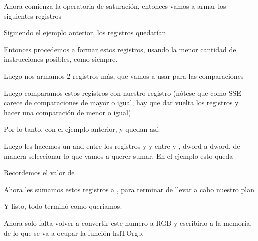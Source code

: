 

Ahora comienza la operatoria de saturación, entonces vamos a armar los siguientes registros



Siguiendo el ejemplo anterior, los registros quedarían





Entonces procedemos a formar estos registros, usando la menor cantidad de instrucciones posibles, como siempre.

Luego nos armamos 2 registros más, que vamos a usar para las comparaciones




Luego comparamos estos registros con nuestro registro  (nótese que como SSE carece de comparaciones de mayor o igual, hay que dar vuelta los registros y hacer una comparación de menor o igual).

Por lo tanto, con el ejemplo anterior,  y  quedan así:




Luego les hacemos un and entre los registros  y  y entre  y , dword a dword, de manera seleccionar lo que vamos a querer sumar. En el ejemplo esto queda




Recordemos el valor de 



Ahora les sumamos estos registros a , para terminar de llevar a cabo nuestro plan


Y listo, todo terminó como queríamos.

Ahora solo falta volver a convertir este numero a RGB y escribirlo a la memoria, de lo que se va a ocupar la función hslTOrgb.

